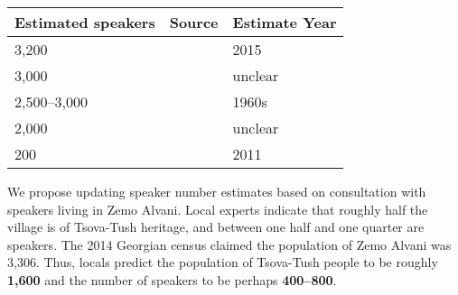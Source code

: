 \documentclass[portrait,fontscale=0.285,a0paper]{baposter2}
\begin{document}
\begin{poster}
{\begin{center}
{\footnotesize
\begin{tabular}{@{}p{0.5in}p{1.5in}p{0.45in}@{}}
\toprule
\textbf{Estimated speakers} \raggedright & \textbf{Source}    \raggedright                                        & \textbf{Estimate Year}   \\ \midrule
3,200                         & \citealt{simonsethnologue2018}   \raggedright                          & 2015             \\
3,000                         & \citealt{comrielinguistic2008,salmineneurope2007,holiskytsova-tush1994}  \raggedright & unclear          \\
2,500--3,000                  & \citealt{kolgabats2001}                  \raggedright                       & 1960s            \\
2,000                         & \citealt{savxelisvili2001}               \raggedright                   & unclear          \\
200                          & \citealt{harrisperception2011}   \raggedright                          & 2011             \\ \bottomrule
\end{tabular}
}
\end{center}

\begin{singlespace}We propose updating speaker number estimates based on consultation with speakers living in Zemo Alvani. Local experts indicate that roughly half the village is of Tsova-Tush heritage, and between one half and one quarter are speakers. The 2014 Georgian census claimed the population of Zemo Alvani was 3,306. Thus, locals predict the population of Tsova-Tush people to be roughly \textbf{1,600} and the number of speakers to be perhaps \textbf{400–800}.
\end{singlespace}




}


\end{poster}
\end{document}
